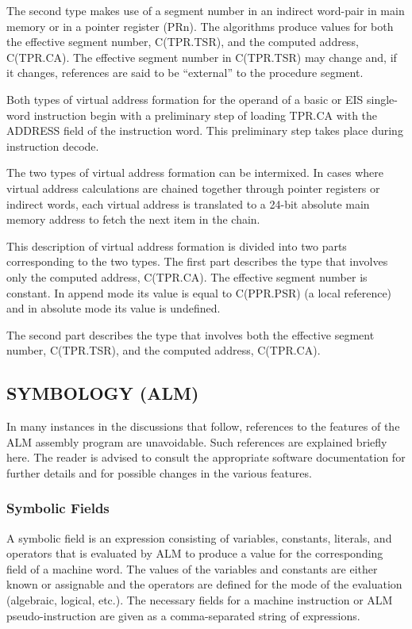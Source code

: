 The second type makes use of a segment number in an indirect word-pair in main
memory or in a pointer register (PRn). The algorithms produce values for both
the effective segment number, C(TPR.TSR), and the computed address, C(TPR.CA).
The effective segment number in C(TPR.TSR) may change and, if it changes,
references are said to be {``}external'' to the procedure segment.


Both types of virtual address formation for the operand of a basic or EIS
single-word instruction begin with a preliminary step of loading TPR.CA with
the ADDRESS field of the instruction word. This preliminary step takes place
during instruction decode.  

The two types of virtual address formation can be intermixed. In cases where
virtual address calculations are chained together through pointer registers or
indirect words, each virtual address is translated to a 24-bit absolute main
memory address to fetch the next item in the chain.  

This description of virtual address formation is divided into two parts
corresponding to the two types. The first part describes the type that involves
only the computed address, C(TPR.CA).  The effective segment number is
constant. In append mode its value is equal to C(PPR.PSR) (a local reference)
and in absolute mode its value is undefined.


The second part describes the type that involves both the effective segment
number, C(TPR.TSR), and the computed address, C(TPR.CA).

\subsection{SYMBOLOGY (ALM)}

In many instances in the discussions that follow, references to the features of
the ALM assembly program are unavoidable. Such references are explained briefly
here. The reader is advised to consult the appropriate software documentation
for further details and for possible changes in the various features.

\subsubsection{Symbolic Fields}

A symbolic field is an expression consisting of variables, constants, literals,
and operators that is evaluated by ALM to produce a value for the corresponding
field of a machine word. The values of the variables and constants are either
known or assignable and the operators are defined for the mode of the
evaluation (algebraic, logical, etc.). The necessary fields for a machine
instruction or ALM pseudo-instruction are given as a comma-separated string of
expressions.

